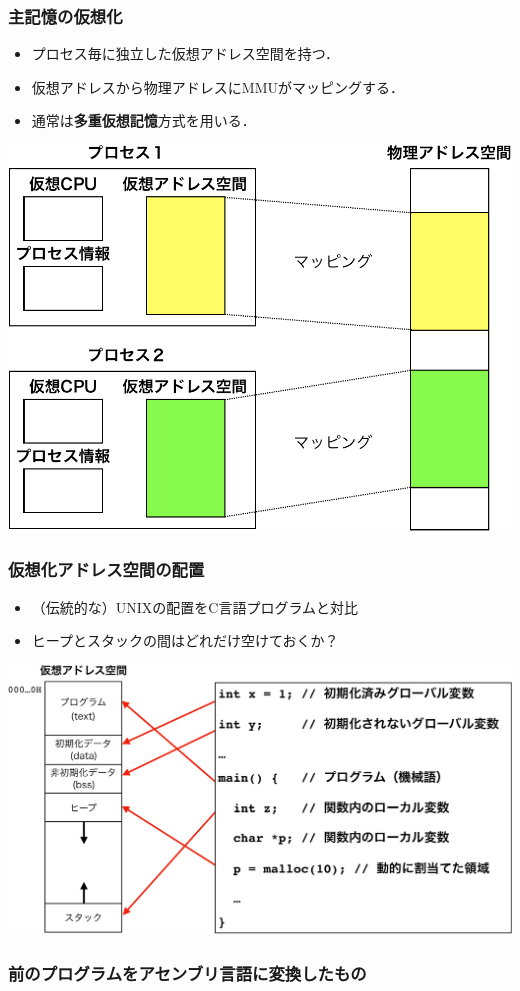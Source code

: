 \documentclass{beamer}                   %
\begin{document}
\begin{frame}
  \frametitle{主記憶の仮想化}
  \begin{itemize}
    \item プロセス毎に独立した仮想アドレス空間を持つ．
    \item 仮想アドレスから物理アドレスにMMUがマッピングする．
    \item 通常は{\bf 多重仮想記憶}方式を用いる．
  \end{itemize}
  \begin{center}
    \includegraphics[scale=0.40]{Fig/memorySpaceMapping-crop.pdf}
  \end{center}
\end{frame}

\begin{frame}
  \frametitle{仮想化アドレス空間の配置}
  \begin{itemize}
    \item （伝統的な）UNIXの配置をC言語プログラムと対比
    \item ヒープとスタックの間はどれだけ空けておくか？
  \end{itemize}
  \begin{center}
    \includegraphics[scale=0.50]{Fig/memoryMapVsClang-crop.pdf}
  \end{center}
\end{frame}

\begin{frame}
  \frametitle{前のプログラムをアセンブリ言語に変換したもの}
  
\end{frame}
\end{document}
